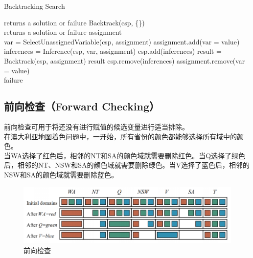 \begin{algorithm}[H]
    \caption{Backtracking Search}
    \begin{algorithmic}[1]
         returns a solution or failure
        \State \Return Backtrack(csp, \{\})
        \EndProcedure
        \\
         returns a solution or failure
        \State \Return assignment
        \EndIf
        \\
        \State var = SelectUnassignedVariable(csp, assignment)
        \State assignment.add({var = value})
        \State inferences = Inference(csp, var, assignment)
        \State csp.add(inferences)
        \State result = Backtrack(csp, assignment)
        \State \Return result
        \EndIf
        \State csp.remove(inferences)
        \EndIf
        \State assignment.remove({var = value})
        \EndIf
        \EndFor
        \\
        \State \Return failure
        \EndProcedure
    \end{algorithmic}
\end{algorithm}

\vspace{0.5cm}

\subsection{前向检查（Forward Checking）}

前向检查可用于将还没有进行赋值的候选变量进行适当排除。\\

在澳大利亚地图着色问题中，一开始，所有省份的颜色都能够选择所有域中的颜色。\\

当WA选择了红色后，相邻的NT和SA的颜色域就需要删除红色。当Q选择了绿色后，相邻的NT、NSW和SA的颜色域就需要删除绿色。当V选择了蓝色后，相邻的NSW和SA的颜色域就需要删除蓝色。

\begin{figure}[H]
    \centering
    \includegraphics[scale=0.75]{img/C2/2-3/2.png}
    \caption{前向检查}
\end{figure}

